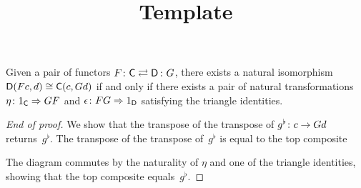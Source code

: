 \documentclass[../../solutions]{subfiles}
\title{Template}
\author{}
\begin{document}
\maketitle

\begin{proposition}
  Given a pair of functors $\afunc{F}{G}{\sC}{\sD}$, there exists a
  natural isomorphism ${\mathsf{D}}(Fc,d)\cong {\mathsf{C}}(c,Gd)$ if and only if there
  exists a pair of natural transformations ${\eta}\colon{1_{\mathsf{C}}}\Rightarrow{GF}$
  and ${\epsilon}\colon{FG}\Rightarrow{1_{\mathsf{D}}}$ satisfying the triangle
  identities.
\end{proposition}
\popthm

\begin{proof}[End of proof]
  We show that the transpose of the transpose of
  ${g^\flat}\colon{c}\to{Gd}$ returns~$g^\flat$.  The transpose of the
  transpose of~$g^\flat$ is equal to the top composite
  \begin{center}
  \end{center}
  The diagram commutes by the naturality of $\eta$ and one of the
  triangle identities, showing that the top composite
  equals~$g^\flat$.
\end{proof}
\end{document}
